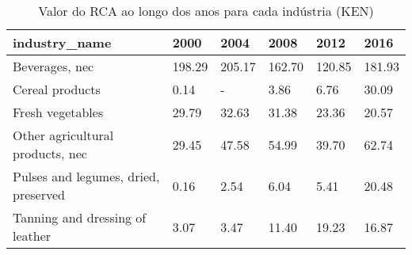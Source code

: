 \begin{table}
\centering
\caption{Valor do RCA ao longo dos anos para cada indústria (KEN)}
\begin{tabular}{p{6cm}p{1.5cm}p{1.5cm}p{1.5cm}p{1.5cm}p{1.5cm}}
\toprule
                       industry\_name &   2000 &   2004 &   2008 &   2012 &   2016 \\
\midrule
                      Beverages, nec & 198.29 & 205.17 & 162.70 & 120.85 & 181.93 \\
                     Cereal products &   0.14 &      - &   3.86 &   6.76 &  30.09 \\
                    Fresh vegetables &  29.79 &  32.63 &  31.38 &  23.36 &  20.57 \\
    Other agricultural products, nec &  29.45 &  47.58 &  54.99 &  39.70 &  62.74 \\
Pulses and legumes, dried, preserved &   0.16 &   2.54 &   6.04 &   5.41 &  20.48 \\
     Tanning and dressing of leather &   3.07 &   3.47 &  11.40 &  19.23 &  16.87 \\
\bottomrule
\end{tabular}
\end{table}
